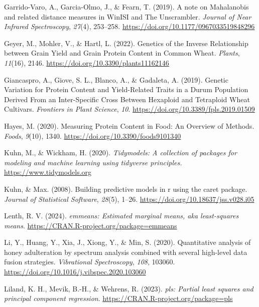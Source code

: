 \documentclass[
]{agujournal2019}
\newlength{\cslhangindent}
\newenvironment{CSLReferences}[2] %
 {\begin{list}{}{%
  \setlength{\itemindent}{0pt}
  \setlength{\leftmargin}{0pt}
  \setlength{\parsep}{0pt}
  \ifodd #1
   \setlength{\leftmargin}{\cslhangindent}
   \setlength{\itemindent}{-1\cslhangindent}
  \fi
  \setlength{\itemsep}{#2\baselineskip}}}
 {\end{list}}
\begin{document}
\begin{CSLReferences}{1}{0}
Garrido-Varo, A., Garcia-Olmo, J., \& Fearn, T. (2019). A note on
{Mahalanobis} and related distance measures in {WinISI} and {The}
{Unscrambler}. \emph{Journal of Near Infrared Spectroscopy},
\emph{27}(4), 253--258. \url{https://doi.org/10.1177/0967033519848296}

Geyer, M., Mohler, V., \& Hartl, L. (2022). Genetics of the {Inverse}
{Relationship} between {Grain} {Yield} and {Grain} {Protein} {Content}
in {Common} {Wheat}. \emph{Plants}, \emph{11}(16), 2146.
\url{https://doi.org/10.3390/plants11162146}

Giancaspro, A., Giove, S. L., Blanco, A., \& Gadaleta, A. (2019).
Genetic {Variation} for {Protein} {Content} and {Yield}-{Related}
{Traits} in a {Durum} {Population} {Derived} {From} an
{Inter}-{Specific} {Cross} {Between} {Hexaploid} and {Tetraploid}
{Wheat} {Cultivars}. \emph{Frontiers in Plant Science}, \emph{10}.
\url{https://doi.org/10.3389/fpls.2019.01509}

Hayes, M. (2020). Measuring {Protein} {Content} in {Food}: {An}
{Overview} of {Methods}. \emph{Foods}, \emph{9}(10), 1340.
\url{https://doi.org/10.3390/foods9101340}

Kuhn, M., \& Wickham, H. (2020). \emph{{Tidymodels}: A collection of
packages for modeling and machine learning using tidyverse principles.}
\url{https://www.tidymodels.org}

Kuhn, \& Max. (2008). Building predictive models in r using the caret
package. \emph{Journal of Statistical Software}, \emph{28}(5), 1--26.
\url{https://doi.org/10.18637/jss.v028.i05}

Lenth, R. V. (2024). \emph{{emmeans}: Estimated marginal means, aka
least-squares means}. \url{https://CRAN.R-project.org/package=emmeans}

Li, Y., Huang, Y., Xia, J., Xiong, Y., \& Min, S. (2020). Quantitative
analysis of honey adulteration by spectrum analysis combined with
several high-level data fusion strategies. \emph{Vibrational
Spectroscopy}, \emph{108}, 103060.
\url{https://doi.org/10.1016/j.vibspec.2020.103060}

Liland, K. H., Mevik, B.-H., \& Wehrens, R. (2023). \emph{{pls}: Partial
least squares and principal component regression}.
\url{https://CRAN.R-project.org/package=pls}


\end{CSLReferences}
\end{document}
